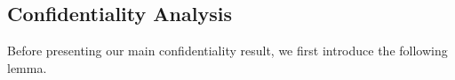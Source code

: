 \documentclass{IEEEtran}
\newtheorem{Remark}{Remark}
\begin{document}


\subsection{Confidentiality Analysis}

Before presenting our main confidentiality result, we first introduce the following lemma.
\end{document}
